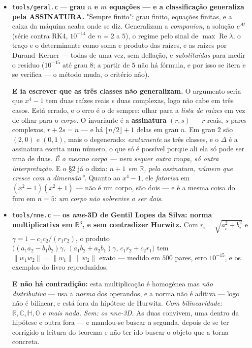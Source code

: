 \documentclass[11pt]{article}
\providecommand{\Oo}{\mathbb O}
\newcommand{\code}[1]{\texttt{\small #1}}
\newcommand{\R}{\mathbb R}
\newcommand{\C}{\mathbb C}
\newcommand{\Hq}{\mathbb H}
\theoremstyle{plain}
\theoremstyle{remark}
\begin{document}
\begin{itemize}
\item \code{tools/geral.c} --- \textbf{grau $n$ e $m$ equações --- e a classificação
generaliza pela ASSINATURA.} "Sempre finito": grau finito, equações finitas, e a caixa da máquina
acaba onde se diz. Generalizam a \emph{companion}, a solução $e^{At}$ (série contra RK4, $10^{-14}$
de $n{=}2$ a $5$), o regime pelo sinal de $\max\operatorname{Re}\lambda$, o traço e o determinante
como soma e produto das raízes, e as raízes por Durand--Kerner --- todas de uma vez, sem deflação, e
\emph{substituídas} para medir o resíduo ($10^{-15}$ até grau $8$; a partir de $5$ não há fórmula,
e por isso se itera e se verifica --- o método muda, o critério não).

\textbf{E ia escrever que as três classes não generalizam.} O argumento seria que $x^4-1$ tem
duas raízes reais \emph{e} duas complexas, logo não cabe em três casos. Está errado, e o erro é o de
sempre: olhar para a \emph{lista de raízes} em vez de olhar para o \emph{corpo}. O invariante é a
\textbf{assinatura} $(r,s)$ --- $r$ reais, $s$ pares complexos, $r+2s=n$ --- e há $\lfloor n/2\rfloor+1$
delas em grau $n$. Em grau $2$ são $(2,0)$ e $(0,1)$, mais o degenerado: \emph{exatamente} as três
classes, e o $\Delta$ é a assinatura escrita num número, o que só é possível porque ali ela só pode
ser uma de duas. \emph{É o mesmo corpo --- nem sequer outra roupa, só outra interpretação.} E o §2
já o dizia: \emph{$n+1$ em $\R$, pela assinatura, número que cresce com a dimensão''}. Quanto ao
$x^4-1$, ele \emph{fatoriza} em $(x^2-1)(x^2+1)$ --- não é um corpo, são dois --- e é a mesma coisa
do furo em $n=5$: \emph{um corpo não sobrevive a ser dois}.

\item \code{tools/nne.c} --- \textbf{os \emph{nne}-3D de Gentil Lopes da Silva: norma
multiplicativa em $\R^3$, e sem contradizer Hurwitz.} Com $r_i=\sqrt{a_i^2+b_i^2}$ e
$\gamma=1-c_1c_2/(r_1r_2)$, o produto $\bigl((a_1a_2-b_1b_2)\gamma,\,(a_1b_2+a_2b_1)\gamma,\,
c_1r_2+c_2r_1\bigr)$ tem $\|w_1w_2\|=\|w_1\|\,\|w_2\|$ exato --- medido em $500$ pares, erro
$10^{-15}$, e os exemplos do livro reproduzidos.

\textbf{E não há contradição:} esta multiplicação é homogénea mas \emph{não distributiva} --- usa
a \emph{norma} dos operandos, e a norma não é aditiva --- logo não é bilinear, e está fora da
hipótese de Hurwitz. \emph{Com bilinearidade: $\R,\C,\Hq,\Oo$ e mais nada. Sem: os nne-3D.} As
duas convivem, uma dentro da hipótese e outra fora --- e mandou-se buscar a segunda,
depois de se ter corrigido a leitura do teorema e não ter ido buscar o objeto que a torna concreta.


\end{itemize}
\end{document}
